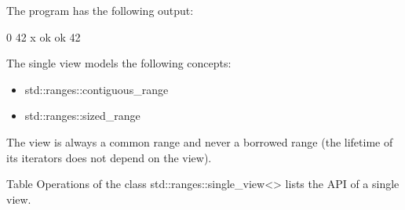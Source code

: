 The program has the following output:

\begin{shell}
0
42
x
ok
ok
42
\end{shell}


The single view models the following concepts:

\begin{itemize}
\item
std::ranges::contiguous\_range

\item
std::ranges::sized\_range
\end{itemize}

The view is always a common range and never a borrowed range (the lifetime of its iterators does not depend on the view).


Table Operations of the class std::ranges::single\_view<> lists the API of a single view.

